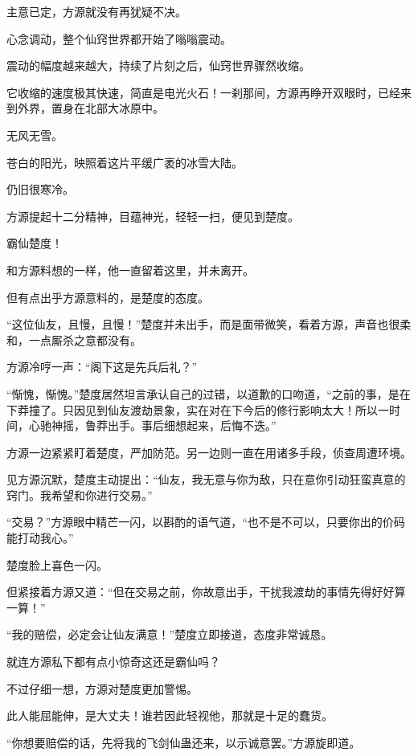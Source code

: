 \begin{this_body}
主意已定，方源就没有再犹疑不决。

心念调动，整个仙窍世界都开始了嗡嗡震动。

震动的幅度越来越大，持续了片刻之后，仙窍世界骤然收缩。

它收缩的速度极其快速，简直是电光火石！一刹那间，方源再睁开双眼时，已经来到外界，置身在北部大冰原中。

无风无雪。

苍白的阳光，映照着这片平缓广袤的冰雪大陆。

仍旧很寒冷。

方源提起十二分精神，目蕴神光，轻轻一扫，便见到楚度。

霸仙楚度！

和方源料想的一样，他一直留着这里，并未离开。

但有点出乎方源意料的，是楚度的态度。

“这位仙友，且慢，且慢！”楚度并未出手，而是面带微笑，看着方源，声音也很柔和，一点厮杀之意都没有。

方源冷哼一声：“阁下这是先兵后礼？”

“惭愧，惭愧。”楚度居然坦言承认自己的过错，以道歉的口吻道，“之前的事，是在下莽撞了。只因见到仙友渡劫景象，实在对在下今后的修行影响太大！所以一时间，心驰神摇，鲁莽出手。事后细想起来，后悔不迭。”

方源一边紧紧盯着楚度，严加防范。另一边则一直在用诸多手段，侦查周遭环境。

见方源沉默，楚度主动提出：“仙友，我无意与你为敌，只在意你引动狂蛮真意的窍门。我希望和你进行交易。”

“交易？”方源眼中精芒一闪，以斟酌的语气道，“也不是不可以，只要你出的价码能打动我心。”

楚度脸上喜色一闪。

但紧接着方源又道：“但在交易之前，你故意出手，干扰我渡劫的事情先得好好算一算！”

“我的赔偿，必定会让仙友满意！”楚度立即接道，态度非常诚恳。

就连方源私下都有点小惊奇这还是霸仙吗？

不过仔细一想，方源对楚度更加警惕。

此人能屈能伸，是大丈夫！谁若因此轻视他，那就是十足的蠢货。

“你想要赔偿的话，先将我的飞剑仙蛊还来，以示诚意罢。”方源旋即道。

\end{this_body}

